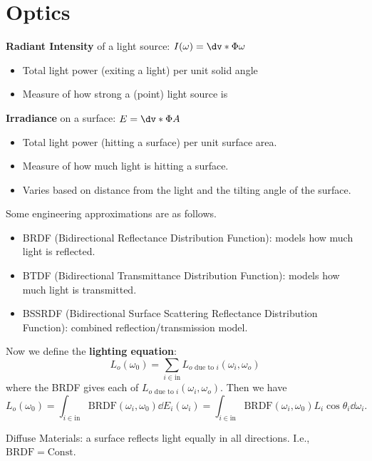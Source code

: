 \section{Optics}
\begin{defi}
	\textbf{Radiant Intensity} of a light source: $I(\omega)=\dv*{\Phi}{\omega}$
	\begin{itemize}
		\vspace{-0.5em}\item Total light power (exiting a light) per unit solid angle
		\vspace{-0.5em}\item Measure of how strong a (point) light source is
	\end{itemize}
\end{defi}
\begin{defi}
	\textbf{Irradiance} on a surface: $E=\dv*{\Phi}{A}$
	\begin{itemize}
		\vspace{-0.5em}\item Total light power (hitting a surface) per unit surface area.
		\vspace{-0.5em}\item Measure of how much light is hitting a surface.
		\vspace{-0.5em}\item Varies based on distance from the light and the tilting angle of the surface.
	\end{itemize}
\end{defi}
Some engineering approximations are as follows.
\begin{itemize}
	\item BRDF (Bidirectional Reflectance Distribution Function): models how much light is reflected.
	\item BTDF (Bidirectional Transmittance Distribution Function): models how much light is transmitted.
	\item BSSRDF (Bidirectional Surface Scattering Reflectance Distribution Function): combined reflection/transmission model.
\end{itemize}

Now we define the \textbf{lighting equation}:
\[
	L_o(\omega_0)=\sum_{i\in\mathrm{in}}L_{o\text{ due to }i}(\omega_i,\omega_o)
\]
where the BRDF gives each of $L_{o\text{ due to }i}(\omega_i,\omega_o)$.
Then we have
\[
	L_o(\omega_0)=\int_{i\in\mathrm{in}}\mathrm{BRDF}(\omega_i,\omega_0)\dd{E_i(\omega_i)}
	=
	\int_{i\in\mathrm{in}}\mathrm{BRDF}(\omega_i,\omega_0)L_i\cos\theta_i\dd{\omega_i}
.\] 

Diffuse Materials: a surface reflects light equally in all directions. I.e., $\mathrm{BRDF}=\mathrm{Const}$.
